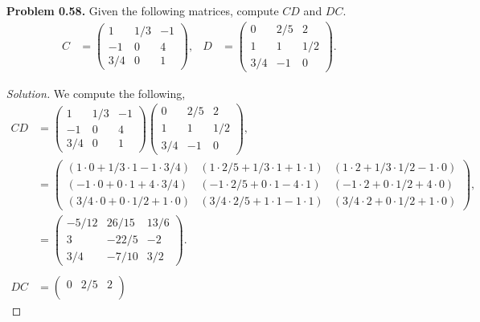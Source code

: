 \documentclass{amsart}
\begin{document}
\begin{enumerate}
		\item[\textbf{Problem 0.58.}] Given the following matrices, compute $CD$ and $DC$.
		\begin{align*}
			C &= \begin{pmatrix}
				1 & 1/3 & -1 \\
				-1 & 0 & 4 \\
				3/4 & 0 & 1
			\end{pmatrix}, & 
			D &= \begin{pmatrix}
				0 & 2/5 & 2 \\
				1 & 1 & 1/2 \\
				3/4 & -1 & 0
			\end{pmatrix}.
		\end{align*}
		\begin{proof}[Solution]
			We compute the following,
				\begin{align*}
					CD &= \begin{pmatrix}
							1 & 1/3 & -1 \\
							-1 & 0 & 4 \\
							3/4 & 0 & 1
						\end{pmatrix}
						\begin{pmatrix}
							0 & 2/5 & 2 \\
							1 & 1 & 1/2 \\
							3/4 & -1 & 0
						\end{pmatrix}, \\
						&= \begin{pmatrix}
						(1 \cdot 0 + 1/3 \cdot 1 - 1 \cdot 3/4) & (1 \cdot 2/5 + 1/3 \cdot 1 + 1 \cdot 1) & (1 \cdot 2 + 1/3 \cdot 1/2 - 1 \cdot 0) \\
						(-1 \cdot 0 + 0 \cdot 1 + 4 \cdot 3/4) & (-1 \cdot 2/5 + 0 \cdot 1 - 4 \cdot 1) & (-1 \cdot 2 + 0 \cdot 1/2 + 4 \cdot 0) \\
						(3/4 \cdot 0 + 0 \cdot 1/2 + 1 \cdot 0) & (3/4 \cdot 2/5 + 1 \cdot 1 - 1 \cdot 1) & (3/4 \cdot 2 + 0 \cdot 1/2 + 1 \cdot 0)
						\end{pmatrix}, \\
						&= \begin{pmatrix}
						-5/12 & 26/15 & 13/6 \\
						3 & -22/5 & -2 \\
						3/4 & -7/10 & 3/2
						\end{pmatrix}. \\ \\
					DC &= \begin{pmatrix}
							0 & 2/5 & 2 \\

\end{pmatrix}
\end{align*}
\end{proof}
\end{enumerate}
\end{document}
